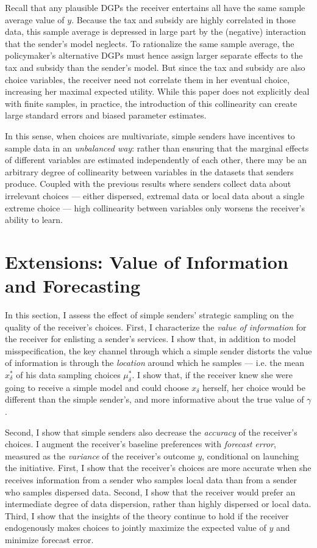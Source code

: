 \documentclass[11pt,dvipsnames]{article}
\begin{document}
Recall that any plausible DGPs the receiver entertains all have the same sample average value of $y$.
Because the tax and subsidy are highly correlated in those data, this sample average is depressed in large part by the (negative) interaction that the sender's model neglects.
To rationalize the same sample average, the policymaker's alternative DGPs must hence assign larger separate effects to the tax and subsidy than the sender's model.
But since the tax and subsidy are also choice variables, the receiver need not correlate them in her eventual choice, increasing her maximal expected utility. While this paper does not explicitly deal with finite samples, in practice, the introduction of this collinearity can create large standard errors and biased parameter estimates.

In this sense, when choices are multivariate, simple senders have incentives to sample data in an \emph{unbalanced way}: rather than ensuring that the marginal effects of different variables are estimated independently of each other, there may be an arbitrary degree of collinearity between variables in the datasets that senders produce.
Coupled with the previous results where senders collect data about irrelevant choices --- either dispersed, extremal data or local data about a single extreme choice --- high collinearity between variables only worsens the receiver's ability to learn.

\section{Extensions: Value of Information and Forecasting}\label{section:extensions}
In this section, I assess the effect of simple senders' strategic sampling on the quality of the receiver's choices.
First, I characterize the \emph{value of information} for the receiver for enlisting a sender's services.
I show that, in addition to model misspecification, the key channel through which a simple sender distorts the value of information is through the \emph{location} around which he samples --- i.e. the mean $x_\delta^*$ of his data sampling choices $\mu_\delta^*$.
I show that, if the receiver knew she were going to receive a simple model and could choose $x_\delta$ herself, her choice would be different than the simple sender's, and more informative about the true value of $\gamma$. 

Second, I show that simple senders also decrease the \emph{accuracy} of the receiver's choices.
I augment the receiver's baseline preferences with \emph{forecast error}, measured as the \emph{variance} of the receiver's outcome $y$, conditional on launching the initiative.
First, I show that the receiver's choices are more accurate when she receives information from a sender who samples local data than from a sender who samples dispersed data.
Second, I show that the receiver would prefer an intermediate degree of data dispersion, rather than highly dispersed or local data.
Third, I show that the insights of the theory continue to hold if the receiver endogenously makes choices to jointly maximize the expected value of $y$ and minimize forecast error.
\end{document}
